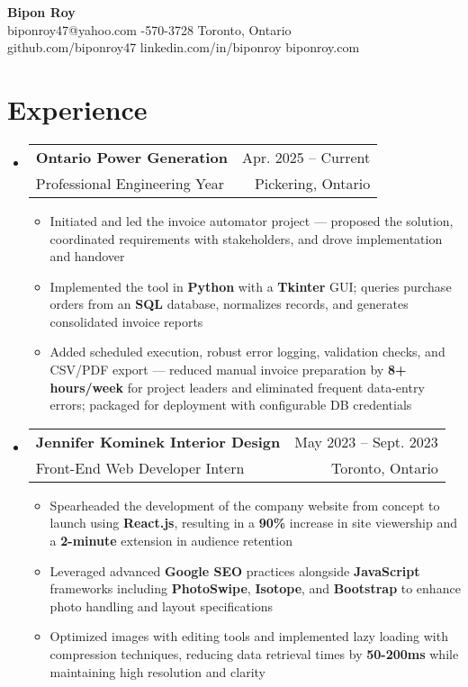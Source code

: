 \documentclass[a4paper,11pt]{article}
\makeatletter
\newcommand{\resumeItem}[1]{
  \item\small{
    {#1 \vspace{-2.5pt}}
  }
}
\newcommand{\resumeSubheading}[4]{
  \vspace{-0pt}\item
    \begin{tabular*}{1.0\textwidth}[t]{l@{\extracolsep{\fill}}r}
      {\large{#1}} & {\small #2} \\
      {#3} & {\small #4} \\
    \end{tabular*}\vspace{-6pt}
}
\newcommand{\resumeSubHeadingListStart}{\begin{itemize}[leftmargin=0.0in, label={}]}
\newcommand{\resumeSubHeadingListEnd}{\end{itemize}\vspace{-10pt}}
\newcommand{\resumeItemListStart}{\begin{itemize}}
\newcommand{\resumeItemListEnd}{\end{itemize}\vspace{-5pt}}
\makeatother
\begin{document}

\begin{center}
  {\textcolor{NavyBlue}{\textbf{\fontsize{28}{32}\selectfont Bipon Roy}}}\\[8pt]
  biponroy47@yahoo.com \enspace\textbullet{}-570-3728 \enspace\textbullet\enspace Toronto, Ontario\\[0pt]
  github.com/biponroy47 \enspace\textbullet\enspace linkedin.com/in/biponroy \enspace\textbullet\enspace biponroy.com
\end{center}

\section{Experience}
  \resumeSubHeadingListStart
  \resumeSubheading
  {\textbf{Ontario Power Generation}}{Apr. 2025 -- Current}
  {Professional Engineering Year}{Pickering, Ontario}
  \resumeItemListStart
    \resumeItem{Initiated and led the invoice automator project — proposed the solution, coordinated requirements with stakeholders, and drove implementation and handover}
    \resumeItem{Implemented the tool in \textbf{Python} with a \textbf{Tkinter} GUI; queries purchase orders from an \textbf{SQL} database, normalizes records, and generates consolidated invoice reports}
    \resumeItem{Added scheduled execution, robust error logging, validation checks, and CSV/PDF export — reduced manual invoice preparation by \textbf{8+ hours/week} for project leaders and eliminated frequent data-entry errors; packaged for deployment with configurable DB credentials}
  \resumeItemListEnd

    \resumeSubheading
      {\textbf{Jennifer Kominek Interior Design}}{May 2023 -- Sept. 2023}
      {Front-End Web Developer Intern}{Toronto, Ontario}
    \resumeItemListStart
      \resumeItem{Spearheaded the development of the company website from concept to launch using \textbf{React.js}, resulting in a \textbf{90\%} increase in site viewership and a \textbf{2-minute} extension in audience retention}
      \resumeItem{Leveraged advanced \textbf{Google SEO} practices alongside \textbf{JavaScript} frameworks including \textbf{PhotoSwipe}, \textbf{Isotope}, and \textbf{Bootstrap} to enhance photo handling and layout specifications}
      \resumeItem{Optimized images with editing tools and implemented lazy loading with compression techniques, reducing data retrieval times by \textbf{50-200ms} while maintaining high resolution and clarity}
    \resumeItemListEnd
  \resumeSubHeadingListEnd
  
\end{document}
